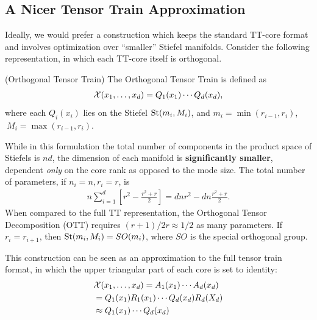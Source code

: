 \subsection{A Nicer Tensor Train Approximation}
Ideally, we would prefer a construction which keeps the standard TT-core format and involves optimization over ``smaller'' Stiefel manifolds. Consider the following representation, in which each TT-core itself is orthogonal.
\begin{definition}\label{def:ott}(Orthogonal Tensor Train)
The Orthogonal Tensor Train is defined as
\begin{align}
\mathcal{X}(x_1,\ldots,x_d) = Q_1(x_1) \cdots Q_d(x_d),
\end{align}
where each $Q_i(x_i)$ lies on the Stiefel $\text{St}(m_i, M_i)$, and $m_i = \min(r_{i-1},r_i)$, $\ M_i = \max(r_{i-1},r_i)$.
\end{definition}
While in this formulation the total number of components in the product space of Stiefels is $nd$, the dimension of each manifold is \textbf{significantly smaller},
dependent {\em only} on the core rank as opposed to the mode size.
The total number of parameters, if $n_i =n, r_i = r$, is
\begin{align}
n \sum_{i=1}^d \left[ r^2 - \frac{r^2 + r}{2}\right] = d n r^2 - dn\frac{r^2 + r}{2}.
\end{align}
When compared to the full TT representation,
the Orthogonal Tensor Decomposition (OTT) requires
$(r+1)/2r \approx 1/2$ as many parameters.
If $r_i=r_{i+1}$, then $\text{St}(m_i, M_i) = SO(m_i)$, where $SO$ is the special orthogonal group.

This construction can be seen as an approximation to the full tensor train format, in which the upper triangular part of each core is set to identity:
\begin{align}
    &\mathcal{X}(x_1,\ldots,x_d) = A_1(x_1)\cdots A_d(x_d) \nonumber\\ &= Q_1(x_1)R_1(x_1)\cdots Q_d(x_d)R_d(X_d) \nonumber\\
    &\approx Q_1(x_1) \cdots Q_d(x_d)
\end{align}

